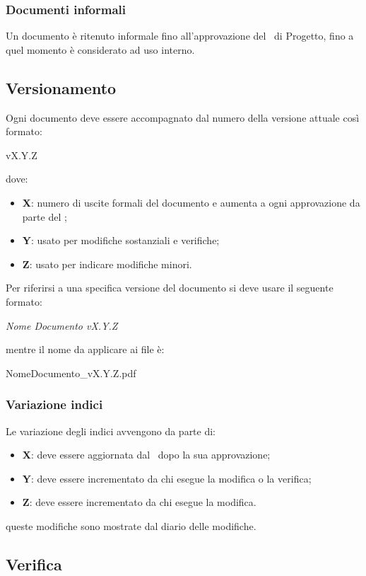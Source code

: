 \documentclass[../NormeDiProgetto.tex]{subfiles}
\begin{document}
		\subsubsection{Documenti informali}
		Un documento è ritenuto informale fino all'approvazione del \responsabilediprogetto\ di Progetto, fino a quel momento è considerato ad uso interno. 
		
		\subsection{Versionamento}
		Ogni documento deve essere accompagnato dal numero della versione attuale così formato:
		\begin{center}
			vX.Y.Z
		\end{center}
		dove:
		\begin{itemize}
			\item \textbf{X}: numero di uscite formali del documento e  aumenta a ogni approvazione da parte del \responsabilediprogetto ;
			\item \textbf{Y}: usato per modifiche sostanziali e verifiche;
			\item \textbf{Z}: usato per indicare modifiche minori. 
		\end{itemize}
		Per riferirsi a una specifica versione del documento si deve usare il seguente formato:\\
		\begin{center}
			\textit{Nome Documento vX.Y.Z}
		\end{center}
		mentre il nome da applicare ai file è:
		\begin{center}
			NomeDocumento\_vX.Y.Z.pdf
		\end{center}
		\subsubsection{Variazione indici}
		Le variazione degli indici avvengono da parte di:
		\begin{itemize}
			\item \textbf{X}: deve essere aggiornata dal \responsabilediprogetto\ dopo la sua approvazione;
			\item \textbf{Y}: deve essere incrementato da chi esegue la modifica o la verifica;
			\item \textbf{Z}: deve essere incrementato da chi esegue la modifica.
		\end{itemize}
		queste modifiche sono mostrate dal diario delle modifiche.
		
		\subsection{Verifica}
\end{document}
